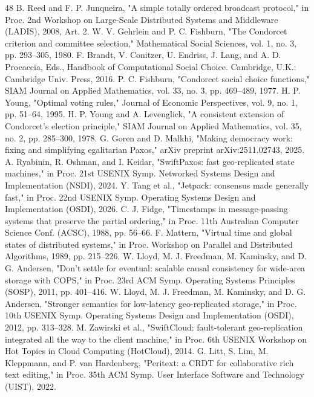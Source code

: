 \documentclass[10pt,twocolumn]{article}
\begin{document}
\begin{thebibliography}{48}
 B. Reed and F. P. Junqueira, "A simple totally ordered broadcast protocol," in Proc. 2nd Workshop on Large-Scale Distributed Systems and Middleware (LADIS), 2008, Art. 2.
 W. V. Gehrlein and P. C. Fishburn, "The Condorcet criterion and committee selection," Mathematical Social Sciences, vol. 1, no. 3, pp. 293–305, 1980.
 F. Brandt, V. Conitzer, U. Endriss, J. Lang, and A. D. Procaccia, Eds., Handbook of Computational Social Choice. Cambridge, U.K.: Cambridge Univ. Press, 2016.
 P. C. Fishburn, "Condorcet social choice functions," SIAM Journal on Applied Mathematics, vol. 33, no. 3, pp. 469–489, 1977.
 H. P. Young, "Optimal voting rules," Journal of Economic Perspectives, vol. 9, no. 1, pp. 51–64, 1995.
 H. P. Young and A. Levenglick, "A consistent extension of Condorcet's election principle," SIAM Journal on Applied Mathematics, vol. 35, no. 2, pp. 285–300, 1978.
 G. Goren and D. Malkhi, "Making democracy work: fixing and simplifying egalitarian Paxos," arXiv preprint arXiv:2511.02743, 2025.
 A. Ryabinin, R. Oshman, and I. Keidar, "SwiftPaxos: fast geo-replicated state machines," in Proc. 21st USENIX Symp. Networked Systems Design and Implementation (NSDI), 2024.
 Y. Tang et al., "Jetpack: consensus made generally fast," in Proc. 22nd USENIX Symp. Operating Systems Design and Implementation (OSDI), 2026.
 C. J. Fidge, "Timestamps in message-passing systems that preserve the partial ordering," in Proc. 11th Australian Computer Science Conf. (ACSC), 1988, pp. 56–66.
 F. Mattern, "Virtual time and global states of distributed systems," in Proc. Workshop on Parallel and Distributed Algorithms, 1989, pp. 215–226.
 W. Lloyd, M. J. Freedman, M. Kaminsky, and D. G. Andersen, "Don't settle for eventual: scalable causal consistency for wide-area storage with COPS," in Proc. 23rd ACM Symp. Operating Systems Principles (SOSP), 2011, pp. 401–416.
 W. Lloyd, M. J. Freedman, M. Kaminsky, and D. G. Andersen, "Stronger semantics for low-latency geo-replicated storage," in Proc. 10th USENIX Symp. Operating Systems Design and Implementation (OSDI), 2012, pp. 313–328.
 M. Zawirski et al., "SwiftCloud: fault-tolerant geo-replication integrated all the way to the client machine," in Proc. 6th USENIX Workshop on Hot Topics in Cloud Computing (HotCloud), 2014.
 G. Litt, S. Lim, M. Kleppmann, and P. van Hardenberg, "Peritext: a CRDT for collaborative rich text editing," in Proc. 35th ACM Symp. User Interface Software and Technology (UIST), 2022.

\end{thebibliography}
\end{document}
